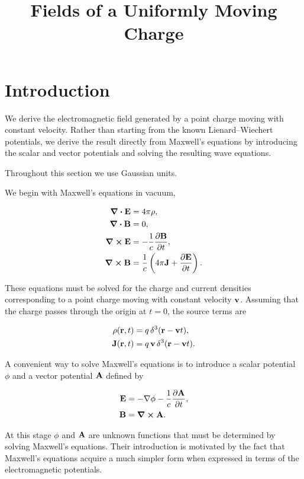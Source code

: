 \documentclass[12pt]{article}
\title{Fields of a Uniformly Moving Charge}
\author{}
\date{}
\begin{document}
\maketitle


\section{Introduction}
We derive the electromagnetic field generated by a point charge moving with
constant velocity. Rather than starting from the known Lienard--Wiechert
potentials, we derive the result directly from Maxwell's equations by
introducing the scalar and vector potentials and solving the resulting wave
equations.

Throughout this section we use Gaussian units.

We begin with Maxwell's equations in vacuum,

\begin{align}
  \div \vb{E}
    &= 4\pi \rho, \\
  \div \vb{B}
    &= 0, \\
  \curl \vb{E}
    &= -\frac{1}{c}\pdv{\vb{B}}{t}, \\
  \curl \vb{B}
    &= \frac{1}{c}\left(4\pi\vb{J}+\pdv{\vb{E}}{t}\right).
    \label{EQ:MAXWELL}
\end{align}

These equations must be solved for the charge and current densities
corresponding to a point charge moving with constant velocity $\vb{v}$.
Assuming that the charge passes through the origin at $t=0$, the source terms
are

\begin{align}
  \rho(\vb{r},t)
    &= q\,\delta^3(\vb{r}-\vb{v}t), \\
  \vb{J}(\vb{r},t)
    &= q\,\vb{v}\,\delta^3(\vb{r}-\vb{v}t).
    \label{eq:uniform_motion_sources}
\end{align}

A convenient way to solve Maxwell's equations is to introduce a scalar
potential $\phi$ and a vector potential $\vb A$ defined by

\begin{align}
  \vb{E}
    &= -\nabla \phi - \frac{1}{c}\pdv{\vb{A}}{t}, \\
  \vb{B}
    &= \curl \vb{A}.
\end{align}

At this stage $\phi$ and $\vb A$ are unknown functions that must be determined
by solving Maxwell's equations. Their introduction is motivated by the fact
that Maxwell's equations acquire a much simpler form when expressed in terms
of the electromagnetic potentials.
\end{document}
